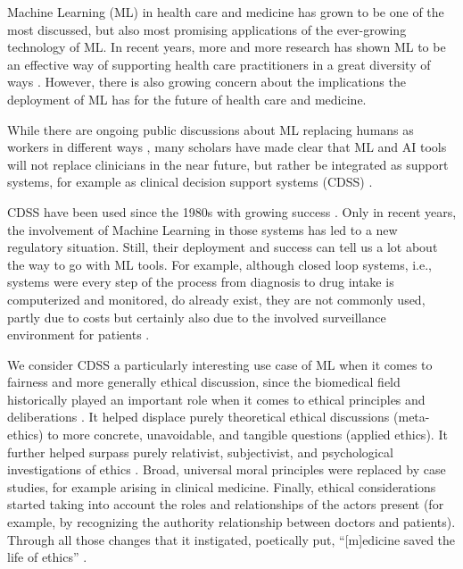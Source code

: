 Machine Learning (ML) in health care and medicine has grown to be one of the most discussed, but also most promising applications of the ever-growing technology of ML.
In recent years, more and more research has shown ML to be an effective way of supporting health care practitioners in a great diversity of ways \cite{rajpurkar2022ai, topol2019high}.
However, there is also growing concern about the implications the deployment of ML has for the future of health care and medicine. 

While there are ongoing public discussions about ML replacing humans as workers in different ways \cite{rinehart2019understanding}, many scholars have made clear that ML and AI tools will not replace clinicians in the near future, but rather be integrated as support systems, for example as clinical decision support systems (CDSS) \cite{Morley2020}.

CDSS have been used since the 1980s with growing success \cite{sutton2020overview}.
Only in recent years, the involvement of Machine Learning in those systems has led to a new regulatory situation.
Still, their deployment and success can tell us a lot about the way to go with ML tools.
For example, although closed loop systems, i.e., systems were every step of the process from diagnosis to drug intake is computerized and monitored, do already exist, they are not commonly used, partly due to costs but certainly also due to the involved surveillance environment for patients \cite{sutton2020overview}. 

We consider CDSS a particularly interesting use case of ML when it comes to fairness and more generally ethical discussion, since the biomedical field historically played an important role when it comes to ethical principles and deliberations \cite{Toulmin1982, Hardin1989}.
It helped displace purely theoretical ethical discussions (meta-ethics) to more concrete, unavoidable, and tangible questions (applied ethics).
It further helped surpass purely relativist, subjectivist, and psychological investigations of ethics \cite{Toulmin1982}.
Broad, universal moral principles were replaced by case studies, for example arising in clinical medicine.
Finally, ethical considerations started taking into account the roles and relationships of the actors present (for example, by recognizing the authority relationship between doctors and patients).
Through all those changes that it instigated, poetically put, ``[m]edicine saved the life of ethics'' \cite{Toulmin1982}.

